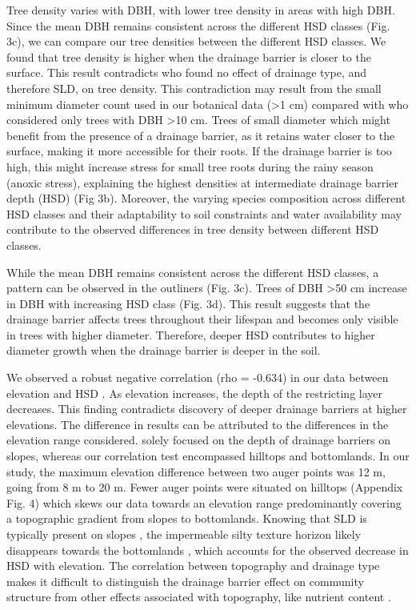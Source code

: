 \documentclass[fleqn,11pt]{latex/stylish_article} %
\begin{document}
Tree density varies with DBH, with lower tree density in areas with high DBH. Since the mean DBH remains consistent across the different HSD classes (Fig. 3c), we can compare our tree densities between the different HSD classes. We found that tree density is higher when the drainage barrier is closer to the surface. This result contradicts \citet{sabatierInfluenceSoilCover1997} who found no effect of drainage type, and therefore SLD, on tree density. This contradiction may result from the small minimum diameter count used in our botanical data (\textgreater1 cm) compared with \citet{sabatierInfluenceSoilCover1997} who considered only trees with DBH \textgreater10 cm. Trees of small diameter which might benefit from the presence of a drainage barrier, as it retains water closer to the surface, making it more accessible for their roots. If the drainage barrier is too high, this might increase stress for small tree roots during the rainy season (anoxic stress), explaining the highest densities at intermediate drainage barrier depth (HSD) (Fig 3b). Moreover, the varying species composition across different HSD classes and their adaptability to soil constraints and water availability may contribute to the observed differences in tree density between different HSD classes.

While the mean DBH remains consistent across the different HSD classes, a pattern can be observed in the outliners (Fig. 3c). Trees of DBH \textgreater50 cm increase in DBH with increasing HSD class (Fig. 3d). This result suggests that the drainage barrier affects trees throughout their lifespan and becomes only visible in trees with higher diameter. Therefore, deeper HSD contributes to higher diameter growth when the drainage barrier is deeper in the soil.

We observed a robust negative correlation (rho = -0.634) in our data between elevation and HSD . As elevation increases, the depth of the restricting layer decreases. This finding contradicts \citet{epronSpatialVariationSoil2006} discovery of deeper drainage barriers at higher elevations. The difference in results can be attributed to the differences in the elevation range considered. \citet{epronSpatialVariationSoil2006} solely focused on the depth of drainage barriers on slopes, whereas our correlation test encompassed hilltops and bottomlands. In our study, the maximum elevation difference between two auger points was 12 m, going from 8 m to 20 m. Fewer auger points were situated on hilltops (Appendix Fig. 4) which skews our data towards an elevation range predominantly covering a topographic gradient from slopes to bottomlands. Knowing that SLD is typically present on slopes \citep{fanHydrologicRegulationPlant2017, pelissierWithinplotRelationshipsTree2002}, the impermeable silty texture horizon likely disappears towards the bottomlands \citep{bouletAnalyseStructuraleCartographie1982}, which accounts for the observed decrease in HSD with elevation. The correlation between topography and drainage type makes it difficult to distinguish the drainage barrier effect on community structure from other effects associated with topography, like nutrient content \citep{pegueroNutrientbasedSpeciesSelection2023, vanlangenhoveNaarEenBeter2020}.
\end{document}
